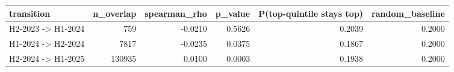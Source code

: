 \begin{tabular}{lrrrrr}
\toprule
transition & n\_overlap & spearman\_rho & p\_value & P(top-quintile stays top) & random\_baseline \\
\midrule
H2-2023 -> H1-2024 & 759 & -0.0210 & 0.5626 & 0.2039 & 0.2000 \\
H1-2024 -> H2-2024 & 7817 & -0.0235 & 0.0375 & 0.1867 & 0.2000 \\
H2-2024 -> H1-2025 & 130935 & 0.0100 & 0.0003 & 0.1938 & 0.2000 \\
\bottomrule
\end{tabular}
